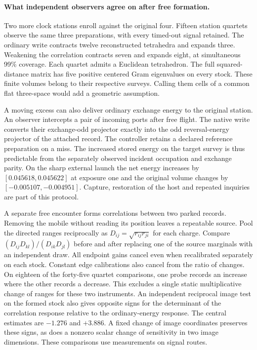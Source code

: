\documentclass[11pt]{article}
\begin{document}
\paragraph{What independent observers agree on after free formation.}
Two more clock stations enroll against the original four. Fifteen
station quartets observe the same three preparations, with every
timed-out signal retained. The ordinary write contracts twelve
reconstructed tetrahedra and expands three. Weakening the correlation
contracts seven and expands eight, at simultaneous 99\% coverage.
Each quartet admits a Euclidean tetrahedron. The full squared-distance
matrix has five positive centered Gram eigenvalues on every stock.
These finite volumes belong to their respective surveys. Calling them
cells of a common flat three-space would add a geometric assumption.

A moving excess can also deliver ordinary exchange energy to the
original station. An observer intercepts a pair of incoming ports
after free flight. The native write converts their exchange-odd
projector exactly into the odd reversal-energy projector of the
attached record. The controller retains a declared reference
preparation on a miss. The increased stored energy on the target
survey is thus predictable from the separately observed incident
occupation and exchange parity. On the sharp external launch the
net energy increases by $[0.045618,0.045622]$ at exposure one and the
original volume changes by $[-0.005107,-0.004951]$. Capture, restoration
of the host and repeated inquiries are part of this protocol.

A separate free encounter forms correlations between two parked
records. Removing the mobile without reading its position leaves a
repeatable source. Pool the directed ranges reciprocally as
$D_{ij}=\sqrt{r_{ij}r_{ji}}$ for each charge. Compare
$(D_{ij}D_{kl})/(D_{ik}D_{jl})$ before and after replacing one of
the source marginals with an independent draw. All endpoint gains
cancel even when recalibrated separately on each stock. Constant
edge calibrations also cancel from the ratio of changes. On eighteen
of the forty-five quartet comparisons, one probe records an increase
where the other records a decrease. This excludes a single static
multiplicative change of ranges for these two instruments. An independent
reciprocal image test on the formed stock also gives opposite signs for
the determinant of the correlation response relative to the
ordinary-energy response. The central estimates are $-1.276$ and
$+3.886$. A fixed change of image coordinates preserves these signs,
as does a nonzero scalar change of sensitivity in two image
dimensions. These comparisons use measurements on signal routes.
\end{document}
